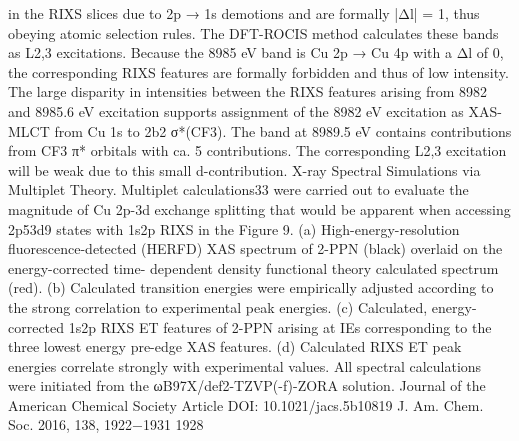 in the RIXS slices due to 2p → 1s demotions and are formally
|Δl| = 1, thus obeying atomic selection rules. The DFT-ROCIS
method calculates these bands as L2,3 excitations. Because the
8985 eV band is Cu 2p → Cu 4p with a Δl of 0, the
corresponding RIXS features are formally forbidden and thus of
low intensity. The large disparity in intensities between the
RIXS features arising from 8982 and 8985.6 eV excitation
supports assignment of the 8982 eV excitation as XAS-MLCT
from Cu 1s to 2b2 σ*(CF3). The band at 8989.5 eV contains
contributions from CF3 π* orbitals with ca. 5%
contributions. The corresponding L2,3 excitation will be weak
due to this small d-contribution.
X-ray Spectral Simulations via Multiplet Theory.
Multiplet calculations33 were carried out to evaluate the
magnitude of Cu 2p-3d exchange splitting that would be
apparent when accessing 2p53d9 states with 1s2p RIXS in the
Figure 9. (a) High-energy-resolution ﬂuorescence-detected (HERFD) XAS spectrum of 2-PPN (black) overlaid on the energy-corrected time-
dependent density functional theory calculated spectrum (red). (b) Calculated transition energies were empirically adjusted according to the strong
correlation to experimental peak energies. (c) Calculated, energy-corrected 1s2p RIXS ET features of 2-PPN arising at IEs corresponding to the
three lowest energy pre-edge XAS features. (d) Calculated RIXS ET peak energies correlate strongly with experimental values. All spectral
calculations were initiated from the ωB97X/def2-TZVP(-f)-ZORA solution.
Journal of the American Chemical Society
Article
DOI: 10.1021/jacs.5b10819
J. Am. Chem. Soc. 2016, 138, 1922−1931
1928


